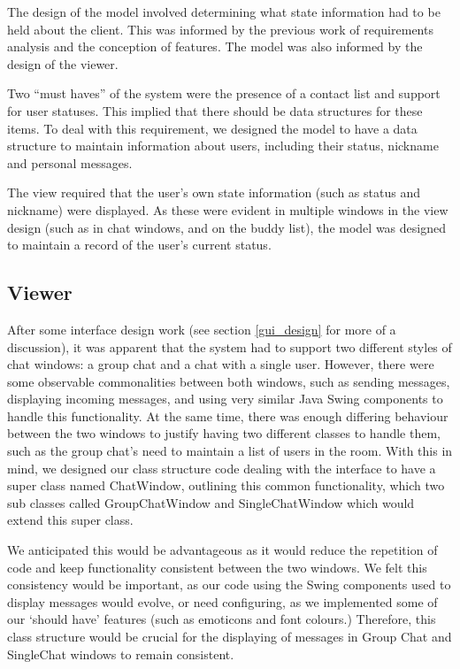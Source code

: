 The design of the model involved determining what state information had to be held about the client. This was informed by the previous work of requirements analysis and the conception of features. The model was also informed by the design of the viewer.

Two ``must haves'' of the system were the presence of a contact list and support for user statuses. This implied that there should be data structures for these items. To deal with this requirement, we designed the model to have a data structure to maintain information about users, including their status, nickname and personal messages. 

The view required that the user's own state information (such as status and nickname) were displayed. As these were evident in multiple windows in the view design (such as in chat windows, and on the buddy list), the model was designed to maintain a record of the user's current status. 

\subsection {Viewer}

After some interface design work (see section \ref{gui_design} for more of a discussion), it was apparent that the system had to support two different styles of chat windows: a group chat and a chat with a single user. However, there were some observable commonalities between both windows, such as sending messages, displaying incoming messages, and using very similar Java Swing components to handle this functionality. At the same time, there was enough differing behaviour between the two windows to justify having two different classes to handle them, such as the group chat's need to maintain a list of users in the room. With this in mind, we designed our class structure code dealing with the interface to have a super class named ChatWindow, outlining this common functionality, which two sub classes called GroupChatWindow and SingleChatWindow which would extend this super class. 

We anticipated this would be advantageous as it would reduce the repetition of code and keep functionality consistent between the two windows. We felt this consistency would be important, as our code using the Swing components used to display messages would evolve, or need configuring, as we implemented some of our `should have' features (such as emoticons and font colours.) Therefore, this class structure would be crucial for the displaying of messages in Group Chat and SingleChat windows to remain consistent.


